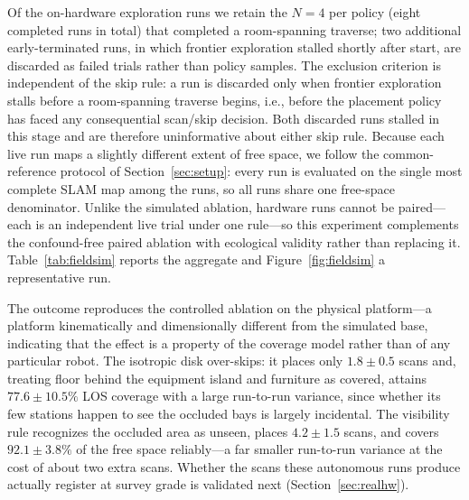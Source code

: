 \documentclass[sensors,article,submit,pdftex,moreauthors]{Definitions/mdpi}
\providecommand{\DIFadd}[1]{{\protect\color{blue} \sf #1}} %
\providecommand{\DIFaddbegin}{} %
\providecommand{\DIFaddend}{} %
\begin{document}
Of the on-hardware exploration runs we retain the $N=4$ per policy (eight
completed runs in total) that completed a room-spanning traverse; two additional
early-terminated runs, in which frontier exploration stalled shortly after
start, are discarded as failed trials rather than policy samples. \DIFaddbegin \DIFadd{The exclusion
criterion is independent of the skip rule: a run is discarded only when frontier
exploration stalls before a room-spanning traverse begins, i.e., before the
placement policy has faced any consequential scan/skip decision. Both discarded
runs stalled in this stage and are therefore uninformative about either skip
rule. }\DIFaddend Because each live run maps a slightly different extent of free space,
we follow the common-reference protocol of Section~\ref{sec:setup}: every run is
evaluated on the single most complete SLAM map among the runs, so all runs share
one free-space denominator. Unlike the simulated ablation, hardware runs cannot
be paired---each is an independent live trial under one rule---so this
experiment complements the confound-free paired ablation with ecological
validity rather than replacing it. Table~\ref{tab:fieldsim} reports the
aggregate and Figure~\ref{fig:fieldsim} a representative run.

The outcome reproduces the controlled ablation on the physical platform---a
platform kinematically and dimensionally different from the simulated base,
indicating that the effect is a property of the coverage model rather than of
any particular robot. The
isotropic disk over-skips: it places only $1.8\pm0.5$ scans and, treating floor
behind the equipment island and furniture as covered, attains $77.6\pm10.5\%$ LOS
coverage with a large run-to-run variance, since whether its few stations happen
to see the occluded bays is largely incidental. The visibility rule recognizes the
occluded area as unseen, places $4.2\pm1.5$ scans, and covers $92.1\pm3.8\%$ of the
free space reliably---a far smaller run-to-run variance at the cost of about
two extra scans. Whether the scans these autonomous runs produce actually
register at survey grade is validated next (Section~\ref{sec:realhw}).
\end{document}
